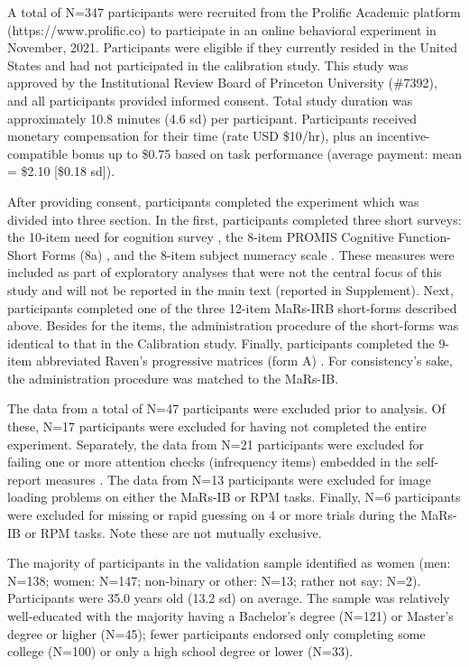 \documentclass[a4paper,man,natbib]{apa6}
\begin{document}
A total of N=347 participants were recruited from the Prolific Academic platform (https://www.prolific.co) to participate in an online behavioral experiment in November, 2021. Participants were eligible if they currently resided in the United States and had not participated in the calibration study. This study was approved by the Institutional Review Board of Princeton University (\#7392), and all participants provided informed consent. Total study duration was approximately 10.8 minutes (4.6 sd) per participant. Participants received monetary compensation for their time (rate USD \$10/hr), plus an incentive-compatible bonus up to \$0.75 based on task performance (average payment: mean = \$2.10 [\$0.18 sd]). 

After providing consent, participants completed the experiment which was divided into three section. In the first, participants completed three short surveys: the 10-item need for cognition survey \citep{chiesi2018applying}, the 8-item PROMIS Cognitive Function-Short Forms (8a) \citep{iverson2021normative}, and the 8-item subject numeracy scale \citep{fagerlin2007measuring}. These measures were included as part of exploratory analyses that were not the central focus of this study and will not be reported in the main text (reported in Supplement). Next, participants completed one of the three 12-item MaRs-IRB short-forms described above. Besides for the items, the administration procedure of the short-forms was identical to that in the Calibration study. Finally, participants completed the 9-item abbreviated Raven's progressive matrices (form A) \citep{bilker2012development}. For consistency's sake, the administration procedure was matched to the MaRs-IB. 

The data from a total of N=47 participants were excluded prior to analysis. Of these, N=17 participants were excluded for having not completed the entire experiment. Separately, the data from N=21 participants were excluded for failing one or more attention checks (infrequency items) embedded in the self-report measures \citep{zorowitz2021inattentive}. The data from N=13 participants were excluded for image loading problems on either the MaRs-IB or RPM tasks. Finally, N=6 participants were excluded for missing or rapid guessing on 4 or more trials during the MaRs-IB or RPM tasks. Note these are not mutually exclusive.

The majority of participants in the validation sample identified as women (men: N=138; women: N=147; non-binary or other: N=13; rather not say: N=2). Participants were 35.0 years old (13.2 sd) on average. The sample was relatively well-educated with the majority having a Bachelor's degree (N=121) or Master's degree or higher (N=45); fewer participants endorsed only completing some college (N=100) or only a high school degree or lower (N=33). 
\end{document}
